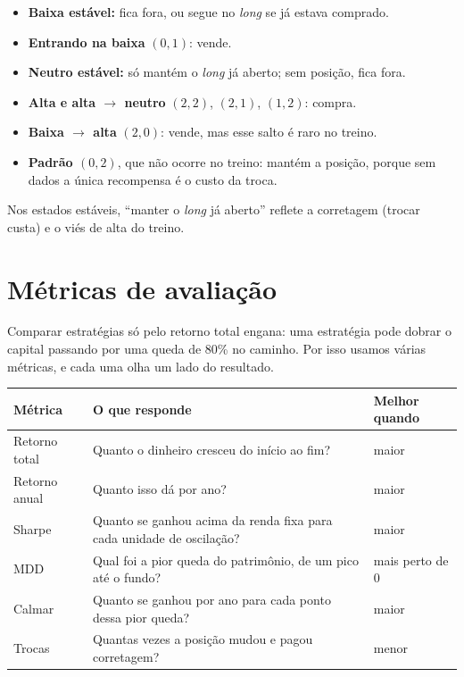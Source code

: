 \documentclass[11pt,a4paper]{article}
\begin{document}
\begin{itemize}
  \item \textbf{Baixa estável:} fica fora, ou segue no \textit{long} se já estava comprado.
  \item \textbf{Entrando na baixa} $(0,1)$: vende.
  \item \textbf{Neutro estável:} só mantém o \textit{long} já aberto; sem posição, fica fora.
  \item \textbf{Alta e alta $\to$ neutro} $(2,2)$, $(2,1)$, $(1,2)$: compra.
  \item \textbf{Baixa $\to$ alta} $(2,0)$: vende, mas esse salto é raro no treino.
  \item \textbf{Padrão $(0,2)$}, que não ocorre no treino: mantém a posição, porque sem dados a única recompensa é o custo da troca.
\end{itemize}
Nos estados estáveis, ``manter o \textit{long} já aberto'' reflete a corretagem (trocar custa) e o viés de alta do treino.

\section{Métricas de avaliação}
\label{sec:metricas}

Comparar estratégias só pelo retorno total engana: uma estratégia pode dobrar o capital passando por uma queda de 80\% no caminho. Por isso usamos várias métricas, e cada uma olha um lado do resultado.

\begin{center}
\small
\begin{tabular}{L{2.6cm} L{9.2cm} L{2.9cm}}
  \toprule
  \textbf{Métrica} & \textbf{O que responde} & \textbf{Melhor quando} \\
  \midrule
  Retorno total & Quanto o dinheiro cresceu do início ao fim? & maior \\
  Retorno anual & Quanto isso dá por ano? & maior \\
  Sharpe        & Quanto se ganhou acima da renda fixa para cada unidade de oscilação? & maior \\
  MDD           & Qual foi a pior queda do patrimônio, de um pico até o fundo? & mais perto de 0 \\
  Calmar        & Quanto se ganhou por ano para cada ponto dessa pior queda? & maior \\
  Trocas        & Quantas vezes a posição mudou e pagou corretagem? & menor \\
  \bottomrule
\end{tabular}
\end{center}
\end{document}

